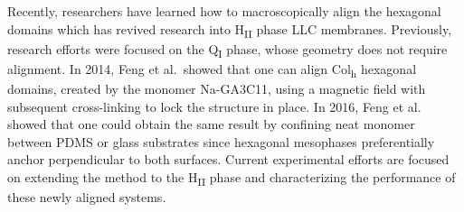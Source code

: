 \documentclass[journal=jpcbfk,manuscript=article]{achemso}
\begin{document}
  Recently, researchers have learned how to macroscopically align the hexagonal
  domains which has revived research into H\textsubscript{II} phase LLC membranes.
  Previously, research efforts were focused on the Q\textsubscript{I} phase,
  whose geometry does not require alignment. In 2014, Feng et al.~showed that one
  can align Col\textsubscript{h} hexagonal domains, created by the monomer Na-GA3C11,
  using a magnetic field with subsequent cross-linking to lock the structure in 
  place\cite{feng_scalable_2014}. In 2016, Feng et al. showed that one could obtain
  the same result by confining neat monomer between PDMS or glass substrates since 
  hexagonal mesophases preferentially anchor perpendicular to both surfaces\cite{feng_thin_2016}.
  Current experimental efforts are focused on extending the method to the 
  H\textsubscript{II} phase and characterizing the performance of these newly aligned systems.

\end{document}
